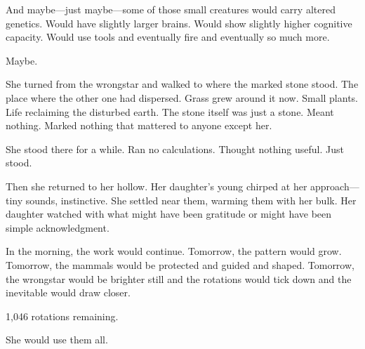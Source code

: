 And maybe—just maybe—some of those small creatures would carry altered genetics. Would have slightly larger brains. Would show slightly higher cognitive capacity. Would use tools and eventually fire and eventually so much more.

Maybe.

She turned from the wrongstar and walked to where the marked stone stood. The place where the other one had dispersed. Grass grew around it now. Small plants. Life reclaiming the disturbed earth. The stone itself was just a stone. Meant nothing. Marked nothing that mattered to anyone except her.

She stood there for a while. Ran no calculations. Thought nothing useful. Just stood.

Then she returned to her hollow. Her daughter's young chirped at her approach—tiny sounds, instinctive. She settled near them, warming them with her bulk. Her daughter watched with what might have been gratitude or might have been simple acknowledgment.

In the morning, the work would continue. Tomorrow, the pattern would grow. Tomorrow, the mammals would be protected and guided and shaped. Tomorrow, the wrongstar would be brighter still and the rotations would tick down and the inevitable would draw closer.

1,046 rotations remaining.

She would use them all.

